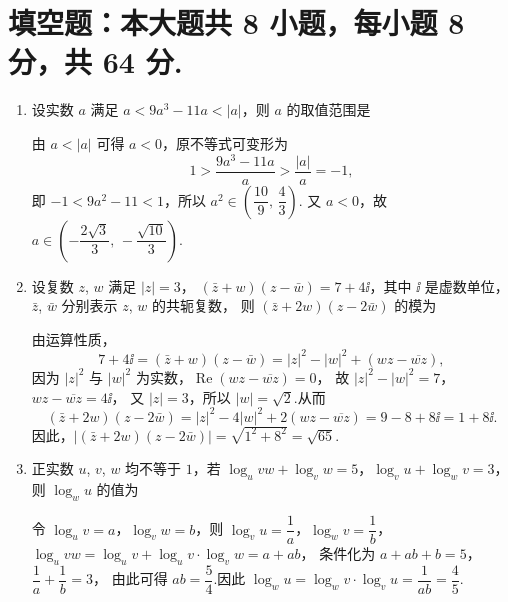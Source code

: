 \documentclass{chsmc}
\begin{document}
\section{填空题：本大题共 8 小题，每小题 8 分，共 64 分.}

\begin{enumerate}
  \item 设实数 $a$ 满足 $a < 9a^3 - 11a < |a|$，则 $a$ 的取值范围是\blankline
    \begin{solution}
      由 $a < |a|$ 可得 $a < 0$，原不等式可变形为
      \[ 1 > \frac{9a^3 - 11a}{a} > \frac{|a|}{a} = -1, \]
      即 $-1 < 9a^2 - 11 < 1$，所以 $a^2 \in \left(\dfrac{10}{9},\, \dfrac{4}{3}\right)$.
      又 $a < 0$，故 $a \in \left( -\dfrac{2\sqrt{3}}{3},\, -\dfrac{\sqrt{10}}{3} \right)$.
    \end{solution}

  \item 设复数 $z$, $w$ 满足 $|z| = 3$，
    $(\bar{z} + w)(z - \bar{w}) = 7 + 4\ii$，其中 $\ii$ 是虚数单位，
    $\bar{z}$, $\bar{w}$ 分别表示 $z$, $w$ 的共轭复数，
    则 $(\bar{z} + 2w)(z - 2\bar{w})$ 的模为\blankline
    \begin{solution}
      由运算性质，
      \[
        7 + 4\ii = (\bar{z} + w)(z - \bar{w})
        = |z|^2 - |w|^2 + (wz - \overline{wz}),
      \]
      因为 $|z|^2$ 与 $|w|^2$ 为实数，$\operatorname{Re}(wz - \overline{wz}) = 0$，
      故 $|z|^2 - |w|^2 = 7$，$wz - \overline{wz} = 4\ii$，
      又 $|z| = 3$，所以 $|w| = \sqrt{2}$.从而
      \[
        (\bar{z} + 2w)(z - 2\bar{w})
        = |z|^2 - 4|w|^2 + 2(wz - \overline{wz})
        = 9 - 8 + 8\ii = 1 + 8\ii.
      \]
      因此，$|(\bar{z} + 2w)(z - 2\bar{w})| = \sqrt{1^2 + 8^2} = \sqrt{65}$.
    \end{solution}

  \item 正实数 $u$, $v$, $w$ 均不等于 $1$，若
    $\log_u vw + \log_v w = 5$，$\log_v u + \log_w v = 3$，
    则 $\log_w u$ 的值为\blankline
    \begin{solution}
      令 $\log_u v = a$，$\log_v w = b$，则
      $\log_v u = \dfrac{1}{a}$，$\log_w v = \dfrac{1}{b}$，
      $\log_u vw = \log_u v + \log_u v \cdot \log_v w = a + ab$，
      条件化为 $a + ab + b = 5$，$\dfrac{1}{a} + \dfrac{1}{b} = 3$，
      由此可得 $ab = \dfrac{5}{4}$.因此
      $\log_w u = \log_w v \cdot \log_v u = \dfrac{1}{ab} = \dfrac{4}{5}$.
    \end{solution}


\end{enumerate}
\end{document}
